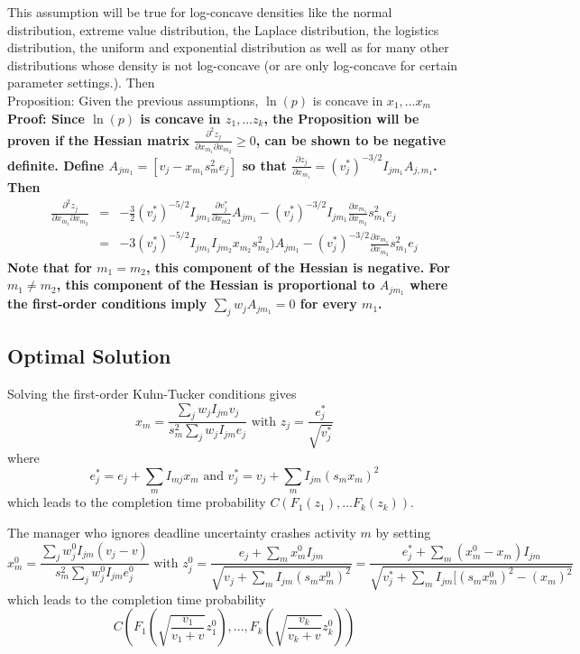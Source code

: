 \documentclass[11pt]{article}
\begin{document}
 This assumption will be true for log-concave densities like the normal distribution, extreme value distribution, the Laplace distribution, the logistics distribution, the uniform and exponential distribution as well as for many other distributions whose density is not log-concave (or are only log-concave for certain parameter settings.). Then
\\ Proposition: \rm Given the previous assumptions, $\ln(p)$ is concave in
$x_1,...x_m$ \\
 \bf Proof: \rm Since $\ln(p)$ is concave in $z_1,...z_k$, the Proposition will be proven if the Hessian matrix $\frac{\partial^2 z_j}{\partial x_{m_1} \partial x_{m_2}} \geq 0$, can be shown to be negative definite.   Define 
$A_{jm_1}=[v_j - x_{m_1} s^2_m e_j] $ so that $\frac{\partial z_j}{\partial x_{m_1}} = (v^*_j)^{-3/2} I_{jm_1} A_{j,m_1} $.  Then
\begin{eqnarray*}
\frac{\partial^2 z_j}{\partial x_{m_1} \partial x_{m_2}} &=& 
-\frac{3}{2} (v^*_j)^{-5/2} I_{jm_1} \frac{\partial v^*_j}{\partial x_{m2}} A_{jm_1}
-  (v^*_j)^{-3/2} I_{jm_1} \frac{\partial x_{m_1}}{\partial x_{m_2}} s^2_{m_1} e_j\\
&=& -3 (v^*_j)^{-5/2} I_{jm_1} I_{jm_2} x_{m_2} s^2_{m_2}) A_{jm_1}
-  (v^*_j)^{-3/2} \frac{\partial x_{m_1}}{\partial x_{m_2}} s^2_{m_1} e_j
\end{eqnarray*} Note that for $m_1=m_2$, this component of the Hessian is negative.  For $m_1 \neq m_2$, this component of the Hessian is  proportional to $A_{jm_1}$ where the first-order conditions imply 
$\sum_j w_j A_{jm_1}=0$ for every $m_1$.  
\subsection{Optimal Solution}
Solving the 
first-order Kuhn-Tucker conditions gives $$x_m=\frac{\sum_j w_j I_{jm} v_j}{s^2_m \sum_j w_j I_{jm} e_j} \mbox{ with }
z_j = \frac{e^*_j}{\sqrt{v^*_j}}  $$
where $$e^*_j=e_j+\sum_m I_{mj} x_m \mbox{ and }
v^*_j=v_j+\sum_m I_{jm} (s_m x_m)^2
$$
which leads to the completion time probability
$C(F_1(z_1),...F_k(z_k))$. 
\par
The manager who ignores deadline uncertainty crashes activity $m$ by setting
$$x^0_m=\frac{\sum_j w^0_j I_{jm} (v_j-v)}{s^2_m \sum_j w^0_j I_{jm} e^0_j}  \mbox{ with }
z^0_j = \frac{e_j+\sum_m x^0_m I_{jm}}{\sqrt{v_j+\sum_m I_{jm} (s_m x^0_m)^2}}=
\frac{e^*_j+\sum_m (x^0_m-x_m) I_{jm}}{\sqrt{v^*_j+\sum_m I_{jm} [(s_m x^0_m)^2-(x_m)^2}}
$$
which leads to the completion time probability
$$C(F_1(\sqrt{\frac{v_1}{v_1+v}} z^0_1),...,F_k(\sqrt{\frac{v_k}{v_k+v}} z^0_k)) $$
\end{document}
